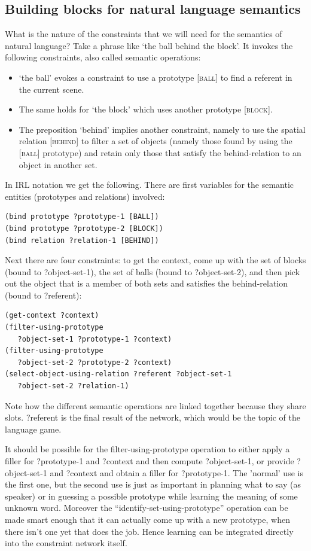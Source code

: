 \subsection{Building blocks for natural language semantics}

What is the nature of the constraints that we will need for the semantics of natural language? 
Take a phrase like `the ball behind the block'. It invokes the following constraints, also called 
semantic operations: 
\begin{itemize}
\item `the ball' evokes a constraint to use a prototype [\textsc{ball}] to find a referent in the current scene.
\item The same holds for `the block' which uses another prototype [\textsc{block}]. 
\item The preposition `behind' implies another constraint, namely to use the spatial relation [\textsc{behind}] to filter a 
set of objects (namely those found by using the [\textsc{ball}] prototype) and retain only those that satisfy the behind-relation 
to an object in another set. 
\end{itemize} 

In IRL notation we get the following. There are first variables for the semantic entities (prototypes and relations) 
involved:
\begin{verbatim}
(bind prototype ?prototype-1 [BALL])
(bind prototype ?prototype-2 [BLOCK])
(bind relation ?relation-1 [BEHIND])
\end{verbatim}
Next there are four constraints: to get the context, come up with the set of blocks
(bound to ?object-set-1), the set of balls (bound to ?object-set-2), and then pick out the object 
that is a member of both sets and satisfies the behind-relation (bound to ?referent): 
\begin{verbatim}
(get-context ?context)
(filter-using-prototype 
   ?object-set-1 ?prototype-1 ?context)
(filter-using-prototype 
   ?object-set-2 ?prototype-2 ?context)
(select-object-using-relation ?referent ?object-set-1
   ?object-set-2 ?relation-1)
\end{verbatim}
Note how the different semantic operations are linked together because they share slots.
?referent is the final result of the network, which would be the topic of the language game. 

It should be possible for the filter-using-prototype operation
to either apply a filler for ?prototype-1 and 
?context and then compute ?object-set-1, or provide ?object-set-1 and ?context and obtain a filler for ?prototype-1. 
The 'normal' use is the first one, but the second use is just as important in planning what to
say (as speaker) or in guessing a possible prototype while learning the meaning of some unknown word. 
Moreover the ``identify-set-using-prototype'' operation can be made smart enough that it can actually come up with
a new prototype, when there isn't one yet that does the job. Hence learning can be 
integrated directly into the constraint network itself. 

